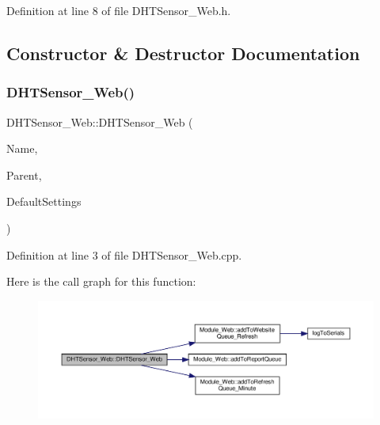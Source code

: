 Definition at line 8 of file D\+H\+T\+Sensor\+\_\+\+Web.\+h.



\subsection{Constructor \& Destructor Documentation}
\mbox{\label{class_d_h_t_sensor___web_a422e637e9933551dd4bd85609d1d20bd}} 
\subsubsection{\texorpdfstring{D\+H\+T\+Sensor\+\_\+\+Web()}{DHTSensor\_Web()}}
{\footnotesize\ttfamily D\+H\+T\+Sensor\+\_\+\+Web\+::\+D\+H\+T\+Sensor\+\_\+\+Web (\begin{DoxyParamCaption}\item[{const \+\_\+\+\_\+\+Flash\+String\+Helper $\ast$}]{Name,  }\item[{\hyperlink{class_module___web}{Module\+\_\+\+Web} $\ast$}]{Parent,  }\item[{\hyperlink{struct_settings_1_1_d_h_t_sensor_settings}{Settings\+::\+D\+H\+T\+Sensor\+Settings} $\ast$}]{Default\+Settings }\end{DoxyParamCaption})}



Definition at line 3 of file D\+H\+T\+Sensor\+\_\+\+Web.\+cpp.

Here is the call graph for this function\+:
\nopagebreak
\begin{figure}[H]
\begin{center}
\leavevmode
\includegraphics[width=350pt]{class_d_h_t_sensor___web_a422e637e9933551dd4bd85609d1d20bd_cgraph}
\end{center}
\end{figure}


